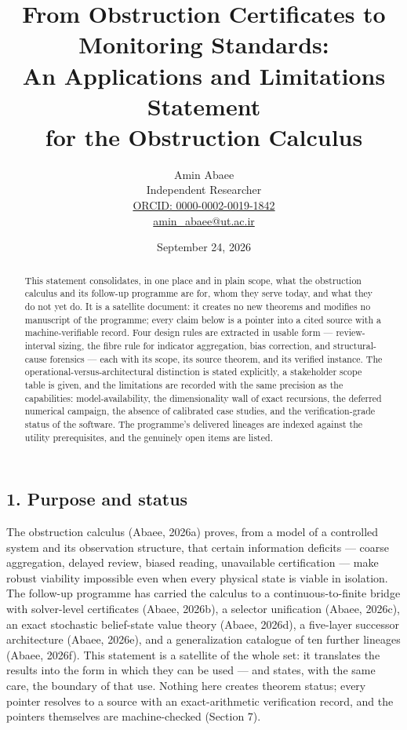 \documentclass[10pt,twocolumn]{article}
\theoremstyle{definition}
\begin{document}
\title{From Obstruction Certificates to Monitoring Standards:\\ An Applications and Limitations Statement\\ for the Obstruction Calculus}
\author{Amin Abaee\\[0.35em]
{\small Independent Researcher}\\[0.55em]
{\small\href{https://orcid.org/0000-0002-0019-1842}{ORCID: 0000-0002-0019-1842}}\\[0.3em]
{\small\href{mailto:amin\_abaee@ut.ac.ir}{amin\_abaee@ut.ac.ir}}}
\date{September 24, 2026}
\maketitle

\begin{abstract}
This statement consolidates, in one place and in plain scope, what the
obstruction calculus and its follow-up programme are for, whom they serve
today, and what they do not yet do. It is a satellite document: it creates
no new theorems and modifies no manuscript of the programme; every claim
below is a pointer into a cited source with a machine-verifiable record.
Four design rules are extracted in usable form --- review-interval sizing,
the fibre rule for indicator aggregation, bias correction, and
structural-cause forensics --- each with its scope, its source theorem,
and its verified instance. The operational-versus-architectural
distinction is stated explicitly, a stakeholder scope table is given, and
the limitations are recorded with the same precision as the
capabilities: model-availability, the dimensionality wall of exact
recursions, the deferred numerical campaign, the absence of calibrated
case studies, and the verification-grade status of the software. The
programme's delivered lineages are indexed against the utility
prerequisites, and the genuinely open items are listed.
\end{abstract}

\subsection{1. Purpose and status}\label{purpose}

The obstruction calculus (Abaee, 2026a) proves, from a model of a
controlled system and its observation structure, that certain information
deficits --- coarse aggregation, delayed review, biased reading,
unavailable certification --- make robust viability impossible even when
every physical state is viable in isolation. The follow-up programme has
carried the calculus to a continuous-to-finite bridge with solver-level
certificates (Abaee, 2026b), a selector unification (Abaee, 2026c), an
exact stochastic belief-state value theory (Abaee, 2026d), a five-layer
successor architecture (Abaee, 2026e), and a generalization catalogue of
ten further lineages (Abaee, 2026f). This statement is a satellite of the
whole set: it translates the results into the form in which they can be
used --- and states, with the same care, the boundary of that use. Nothing
here creates theorem status; every pointer resolves to a source with an
exact-arithmetic verification record, and the pointers themselves are
machine-checked (Section 7).
\end{document}

